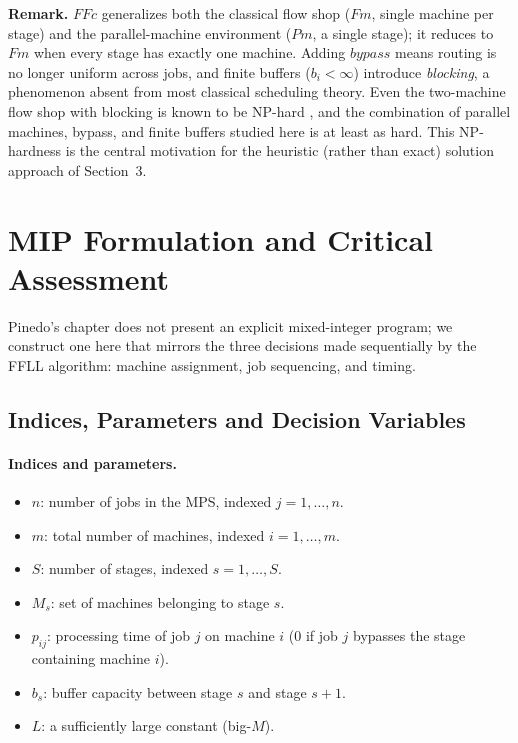 \documentclass[11pt,a4paper]{article}
\begin{document}
\textbf{Remark.} $FFc$ generalizes both the classical flow shop ($Fm$,
single machine per stage) and the parallel-machine environment
($Pm$, a single stage); it reduces to $Fm$ when every stage has exactly one
machine. Adding $bypass$ means routing is no longer uniform across jobs,
and finite buffers ($b_i<\infty$) introduce \emph{blocking}, a phenomenon
absent from most classical scheduling theory. Even the two-machine flow
shop with blocking is known to be NP-hard
\citep{hall1996machine}, and the combination of parallel machines,
bypass, and finite buffers studied here is at least as hard. This
NP-hardness is the central motivation for the heuristic (rather than exact)
solution approach of Section~3.

\section{MIP Formulation and Critical Assessment}

Pinedo's chapter does not present an explicit mixed-integer program; we
construct one here that mirrors the three decisions made sequentially by
the FFLL algorithm: machine assignment, job sequencing, and timing.

\subsection{Indices, Parameters and Decision Variables}

\paragraph{Indices and parameters.}
\begin{itemize}
  \item $n$: number of jobs in the MPS, indexed $j=1,\dots,n$.
  \item $m$: total number of machines, indexed $i=1,\dots,m$.
  \item $S$: number of stages, indexed $s=1,\dots,S$.
  \item $M_s$: set of machines belonging to stage $s$.
  \item $p_{ij}$: processing time of job $j$ on machine $i$ ($0$ if job $j$
    bypasses the stage containing machine $i$).
  \item $b_s$: buffer capacity between stage $s$ and stage $s+1$.
  \item $L$: a sufficiently large constant (big-$M$).
\end{itemize}
\end{document}
